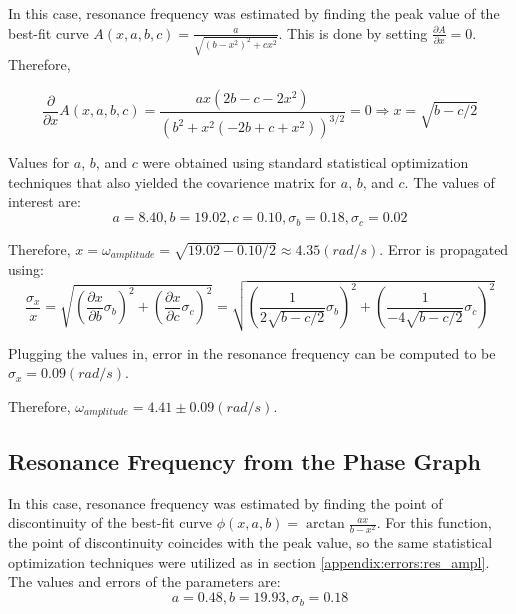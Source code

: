 In this case, resonance frequency was estimated by finding the peak value of the best-fit curve $A(x, a, b, c) = \frac{a}{\sqrt{(b-x^2)^2 + cx^2}}$. This is done by setting $\frac{\partial A}{\partial x} = 0$. Therefore,

\begin{equation*}
  \frac{\partial}{\partial x} A(x, a, b, c) = \frac{ax(2b-c-2x^2)}{( b^2 + x^2 (-2b + c + x^2) )^{3/2}} = 0 \Rightarrow x = \sqrt{b - c/2}
\end{equation*}

Values for $a$, $b$, and $c$ were obtained using standard statistical optimization techniques that also yielded the covarience matrix for $a$, $b$, and $c$. The values of interest are:
\begin{equation*}
  a = 8.40, b = 19.02, c = 0.10, \sigma_b = 0.18, \sigma_c = 0.02
\end{equation*}

Therefore, $x = \omega_{amplitude} = \sqrt{19.02 - 0.10 /2} \approx 4.35 (rad/s)$. Error is propagated using:
\begin{equation*}
  \frac{\sigma_{x}}{x} = \sqrt{ \left( \frac{\partial x}{\partial b} \sigma_b \right)^2 + \left( \frac{\partial x}{\partial c} \sigma_c \right)^2} = \sqrt{ \left( \frac{1}{2\sqrt{b - c/2}} \sigma_b \right)^2 + \left( \frac{1}{-4\sqrt{b-c/2}} \sigma_c \right)^2} 
\end{equation*}

Plugging the values in, error in the resonance frequency can be computed to be $\sigma_{x} = 0.09 (rad/s)$.

Therefore, $\omega_{amplitude} = 4.41 \pm 0.09 (rad/s)$.

\subsection{ Resonance Frequency from the Phase Graph } \label{appendix:errors:res_phase}

In this case, resonance frequency was estimated by finding the point of discontinuity of the best-fit curve $\phi(x, a, b) = \arctan \frac{ax}{b - x^2}$. For this function, the point of discontinuity coincides with the peak value, so the same statistical optimization techniques were utilized as in section \ref{appendix:errors:res_ampl}. The values and errors of the parameters are:
\begin{equation*}
  a=0.48, b = 19.93, \sigma_b = 0.18
\end{equation*}

